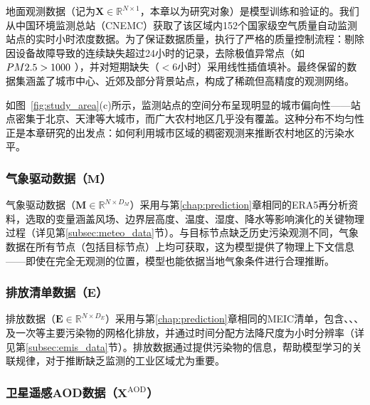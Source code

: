 地面观测数据（记为$\mathbf{X} \in \mathbb{R}^{N \times 1}$，本章以\PM 为研究对象）是模型训练和验证的。我们从中国环境监测总站（CNEMC）获取了该区域内152个国家级空气质量自动监测站点的实时小时浓度数据。为了保证数据质量，执行了严格的质量控制流程：剔除因设备故障导致的连续缺失超过24小时的记录，去除极值异常点（如$PM2.5 > 1000$ \ug{}），并对短期缺失（$<$6小时）采用线性插值填补。最终保留的数据集涵盖了城市中心、近郊及部分背景站点，构成了稀疏但高精度的观测网络。

如图~\ref{fig:study_area}(c)所示，监测站点的空间分布呈现明显的城市偏向性——站点密集于北京、天津等大城市，而广大农村地区几乎没有覆盖。这种分布不均匀性正是本章研究的出发点：如何利用城市区域的稠密观测来推断农村地区的污染水平。


\subsubsection[气象驱动数据（\texorpdfstring{$\mathbf{M}$}{M}）]{气象驱动数据（$\mathbf{M}$）}

气象驱动数据（$\mathbf{M} \in \mathbb{R}^{N \times D_M}$）采用与第\ref{chap:prediction}章相同的ERA5再分析资料\citep{hersbach2020era5}，选取的变量涵盖风场、边界层高度、温度、湿度、降水等影响\PM 演化的关键物理过程（详见第\ref{subsec:meteo_data}节）。与目标节点缺乏历史污染观测不同，气象数据在所有节点（包括目标节点）上均可获取，这为模型提供了物理上下文信息——即使在完全无观测的位置，模型也能依据当地气象条件进行合理推断。


\subsubsection[排放清单数据（\texorpdfstring{$\mathbf{E}$}{E}）]{排放清单数据（$\mathbf{E}$）}

排放数据（$\mathbf{E} \in \mathbb{R}^{N \times D_E}$）采用与第\ref{chap:prediction}章相同的MEIC清单\citep{zheng2018trends,li2017anthropogenic}，包含\NOx{}、\VOCs{}、\SOtwo{}、\NHthree{}及一次\PM 等主要污染物的网格化排放，并通过时间分配方法降尺度为小时分辨率（详见第\ref{subsec:emis_data}节）。排放数据通过提供污染物的信息，帮助模型学习的关联规律，对于推断缺乏监测的工业区域尤为重要。


\subsubsection[卫星遥感AOD数据（\texorpdfstring{$\mathbf{X}^{\text{AOD}}$}{X\textasciicircum AOD}）]{卫星遥感AOD数据（$\mathbf{X}^{\text{AOD}}$）}
\label{subsubsec:aod_data}

